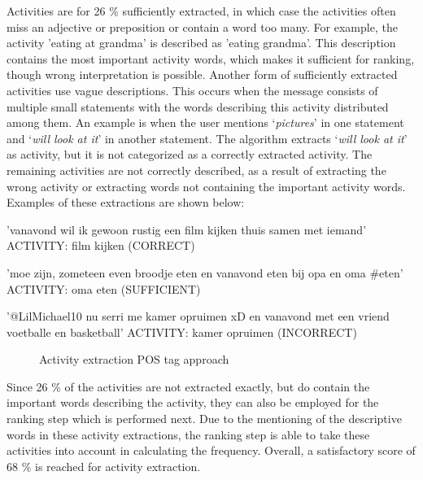 Activities are for 26 \% sufficiently extracted, in which case the activities often miss an adjective or preposition or contain a word too many. For example, the activity 'eating at grandma' is described as 'eating grandma'. This description contains the most important activity words, which makes it sufficient for ranking, though wrong interpretation is possible. Another form of sufficiently extracted activities use vague descriptions. This occurs when the message consists of multiple small statements with the words describing this activity distributed among them. An example is when the user mentions `\textit{pictures}' in one statement and `\textit{will look at it}' in another statement. The algorithm extracts `\textit{will look at it}' as activity, but it is not categorized as a correctly extracted activity. The remaining activities are not correctly described, as a result of extracting the wrong activity or extracting words not containing the important activity words. Examples of these extractions are shown below:

\begin{verbbox}
'vanavond wil ik gewoon rustig een film kijken thuis samen 
met iemand'
ACTIVITY: film kijken (CORRECT)

'moe zijn, zometeen even broodje eten en vanavond eten bij 
opa en oma #eten'
ACTIVITY: oma eten (SUFFICIENT)

'@LilMichael10  nu serri me kamer opruimen xD en vanavond 
met een vriend voetballe en basketball'
ACTIVITY: kamer opruimen (INCORRECT)
\end{verbbox}
\begin{figure}
  \centering

\begin{framed}
  \theverbbox
\end{framed}
  \caption{Activity extraction POS tag approach}\label{fig:pos}
\end{figure}

Since 26 \% of the activities are not extracted exactly, but do contain the important words describing the activity, they can also be employed for the ranking step which is performed next. Due to the mentioning of the descriptive words in these activity extractions, the ranking step is able to take these activities into account in calculating the frequency. Overall, a satisfactory score of 68 \% is reached for activity extraction.


